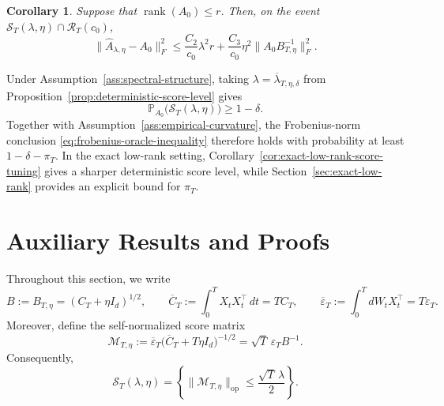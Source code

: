 \documentclass[11pt]{article}
\newtheorem{corollary}[theorem]{Corollary}
\begin{document}
\begin{corollary}
\label{cor:exact-low-rank-oracle}
Suppose that $\operatorname{rank}(A_0)\leq r$. Then, on the event
$\mathcal S_T(\lambda,\eta)\cap\mathcal R_T(c_0)$,
\begin{equation}
    \big\|\widehat A_{\lambda,\eta}-A_0\big\|_F^2
    \leq
    \frac{C_2}{c_0}\lambda^2r
    +\frac{C_3}{c_0}\eta^2
    \big\|A_0B_{T,\eta}^{-1}\big\|_F^2.
\label{eq:exact-low-rank-oracle-inequality}
\end{equation}
\end{corollary}

\noindent
Under Assumption~\ref{ass:spectral-structure}, taking
$\lambda=\overline\lambda_{T,\eta,\delta}$ from
Proposition~\ref{prop:deterministic-score-level} gives
\[
    \mathbb P_{A_0}\big(
        \mathcal S_T(\lambda,\eta)
    \big)\geq1-\delta.
\]
Together with Assumption~\ref{ass:empirical-curvature}, the Frobenius-norm
conclusion \eqref{eq:frobenius-oracle-inequality} therefore holds with
probability at least $1-\delta-\pi_T$. In the exact low-rank setting,
Corollary~\ref{cor:exact-low-rank-score-tuning} gives a sharper deterministic
score level, while Section~\ref{sec:exact-low-rank} provides an explicit bound
for $\pi_T$.






\section{Auxiliary Results and Proofs}
\label{sec:auxiliary-results}


Throughout this section, we write
\[
    B:=B_{T,\eta}=(C_T+\eta I_d)^{1/2},
    \qquad
    \overline C_T:=\int_0^T X_tX_t^\top\,dt=TC_T,
    \qquad
    \overline\varepsilon_T:=\int_0^T dW_tX_t^\top=T\varepsilon_T.
\]
Moreover, define the self-normalized score matrix
\begin{equation}
    \mathcal M_{T,\eta}
    :=\overline\varepsilon_T
      \big(\overline C_T+T\eta I_d\big)^{-1/2}
    =\sqrt T\,\varepsilon_TB^{-1}.
\label{eq:unnormalized-self-normalized-score}
\end{equation}
Consequently,
\begin{equation}
    \mathcal S_T(\lambda,\eta)
    =
    \left\{
        \|\mathcal M_{T,\eta}\|_{\mathrm{op}}
        \leq \frac{\sqrt T\,\lambda}{2}
    \right\}.
\label{eq:score-event-unnormalized}
\end{equation}
\end{document}
